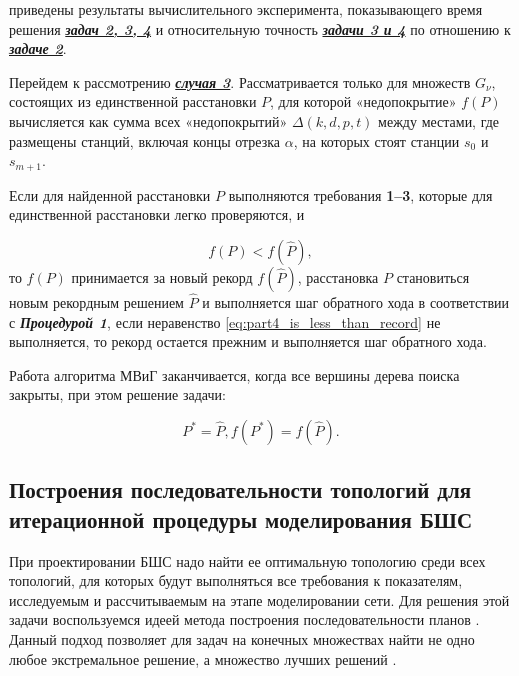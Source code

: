  приведены результаты вычислительного эксперимента, показывающего время решения \underline{\textit{\textbf{задач 2, 3, 4}}} и относительную точность \underline{\textit{\textbf{задачи 3 и 4}}} по отношению к \underline{\textit{\textbf{задаче 2}}}.

Перейдем к рассмотрению \underline{\textit{\textbf{случая 3}}}. Рассматривается только для множеств $G_\nu$, состоящих из единственной расстановки $P$, для которой «недопокрытие» $f(P)$ вычисляется как сумма всех «недопокрытий» $\Delta(k,d,p,t)$ между местами, где размещены станций, включая концы отрезка $\alpha$, на которых стоят станции $s_0$ и $s_{m+1}$. 

Если для найденной расстановки $P$ выполняются требования \textbf{1--3}, которые для единственной расстановки легко проверяются, и

\begin{equation}
    \label{eq:part4_is_less_than_record}
    f(P) < f(\widehat{P}),
\end{equation}
то $f(P)$ принимается за новый рекорд $f(\widehat{P})$, расстановка $P$ становиться новым рекордным решением $\widehat{P}$ и выполняется шаг обратного хода в соответствии с \textit{\textbf{Процедурой 1}}, если неравенство \cref{eq:part4_is_less_than_record} не выполняется, то рекорд остается прежним и выполняется шаг обратного хода.

Работа алгоритма МВиГ заканчивается, когда все вершины дерева поиска закрыты, при этом решение задачи: 

\begin{displaymath}
    P^{*} = \widehat{P},  f(P^*) = f(\widehat{P}).
\end{displaymath}

\subsection{Построения последовательности топологий для итерационной процедуры моделирования БШС}

При проектировании БШС надо найти ее оптимальную топологию среди всех топологий, для которых будут выполняться все требования к показателям, исследуемым и рассчитываемым на этапе моделировании сети. Для решения этой задачи воспользуемся идеей метода построения последовательности планов \cite{Emelichev}. Данный подход позволяет для задач на конечных множествах найти не одно любое экстремальное решение, а множество лучших решений \cite{Pershin1999, Pershin2002}.

